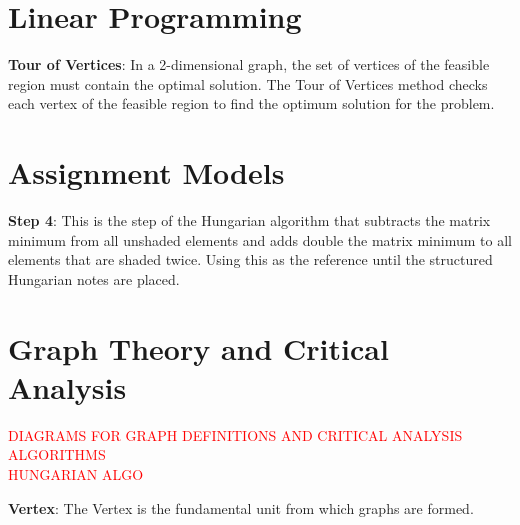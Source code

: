 %
%
%



\section{Linear Programming} \label{Module1:LinearProgramming}

\begin{defn}\label{mod1:defn:TourOfVertices}
	\textbf{Tour of Vertices}: In a 2-dimensional graph, the set of vertices of the feasible region must contain the optimal solution. The Tour of Vertices method checks each vertex of the feasible region to find the optimum solution for the problem.
\end{defn}

\section{Assignment Models} \label{Module1:AsgnmtModels}

\begin{defn} \label{mod1:defn:HungAlgStep4}
	\textbf{Step 4}: This is the step of the Hungarian algorithm that subtracts the matrix minimum from all unshaded elements and adds double the matrix minimum to all elements that are shaded twice. Using this as the reference until the structured Hungarian notes are placed.
\end{defn}

\section{Graph Theory and Critical Analysis} \label{Module1:GraphTheoryCriticalAnalysis}

\textcolor{red} {DIAGRAMS FOR GRAPH DEFINITIONS  AND CRITICAL ANALYSIS ALGORITHMS}\\
\textcolor{red}{HUNGARIAN ALGO}
\begin{defn}\label{mod1:defn:Vertex}
   \textbf{Vertex}: The Vertex is the fundamental unit from which graphs are formed.
\end{defn}

